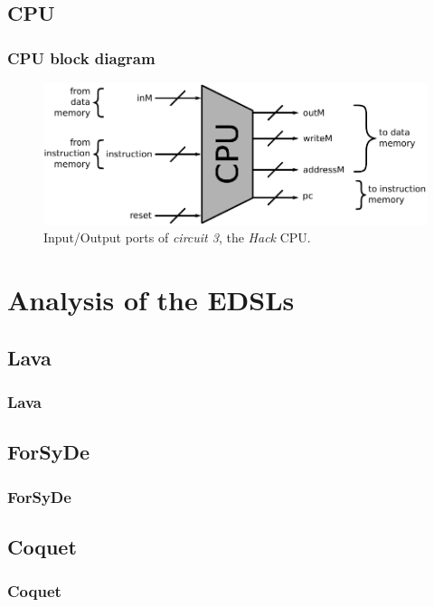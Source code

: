 \documentclass{beamer}
\begin{document}
        \subsection{CPU}
        \label{subsec:cpu}
            \begin{frame}
                \frametitle{CPU block diagram}

                \begin{figure}[h!]
                    \centerline{\includegraphics[width=1.0\textwidth]{imgs/cpu-block.pdf}}
                    \caption{Input/Output ports of \emph{circuit 3}, the \emph{Hack} CPU.
                        \label{fig:cpu-block}}
                \end{figure}
            \end{frame}



    \section{Analysis of the EDSLs}
    \label{sec:analysis-of-the-edsls}
        \frame{\sectionpage}

        \subsection{Lava}
        \label{subsec:lava}
            \begin{frame}
                \frametitle{Lava}
            \end{frame}

        \subsection{ForSyDe}
        \label{subsec:forsyde}
            \begin{frame}
                \frametitle{ForSyDe}
            \end{frame}

        \subsection{Coquet}
        \label{subsec:coquet}
            \begin{frame}
                \frametitle{Coquet}
            \end{frame}
\end{document}
